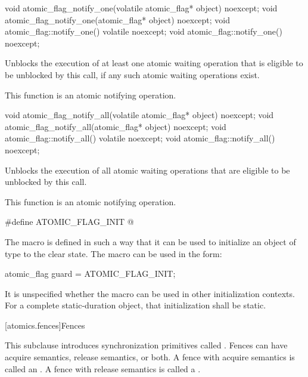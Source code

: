 \begin{itemdecl}
void atomic_flag_notify_one(volatile atomic_flag* object) noexcept;
void atomic_flag_notify_one(atomic_flag* object) noexcept;
void atomic_flag::notify_one() volatile noexcept;
void atomic_flag::notify_one() noexcept;
\end{itemdecl}

\begin{itemdescr}
\pnum
\effects
Unblocks the execution of at least one atomic waiting operation
that is eligible to be unblocked by this call,
if any such atomic waiting operations exist.

\pnum
\remarks
This function is an atomic notifying operation.
\end{itemdescr}

\begin{itemdecl}
void atomic_flag_notify_all(volatile atomic_flag* object) noexcept;
void atomic_flag_notify_all(atomic_flag* object) noexcept;
void atomic_flag::notify_all() volatile noexcept;
void atomic_flag::notify_all() noexcept;
\end{itemdecl}

\begin{itemdescr}
\pnum
\effects
Unblocks the execution of all atomic waiting operations
that are eligible to be unblocked by this call.

\pnum
\remarks
This function is an atomic notifying operation.
\end{itemdescr}

%
\begin{itemdecl}
#define ATOMIC_FLAG_INIT @\seebelow@
\end{itemdecl}

\begin{itemdescr}
\pnum
\remarks
The macro  is defined in such a way that
it can be used to initialize an object of type 
to the clear state.
The macro can be used in the form:
\begin{codeblock}
atomic_flag guard = ATOMIC_FLAG_INIT;
\end{codeblock}
It is unspecified whether the macro can be used
in other initialization contexts.
For a complete static-duration object, that initialization shall be static.
\end{itemdescr}

[atomics.fences]{Fences}

\pnum
This subclause introduces synchronization primitives called . Fences can have
acquire semantics, release semantics, or both. A fence with acquire semantics is called
an . A fence with release semantics is called a .

